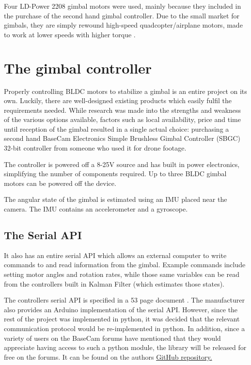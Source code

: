 Four LD-Power 2208 gimbal motors were used, mainly because they included in the purchase of the second hand gimbal controller. Due to the small market for gimbals, they are simply rewound high-speed quadcopter/airplane motors, made to work at lower speeds with higher torque \cite{website:rewinding_bldc_gimbal}.

\section{The gimbal controller}
Properly controlling BLDC motors to stabilize a gimbal is an entire project on its own. Luckily, there are well-designed existing products which easily fulfil the requirements needed. While research was made into the strengths and weakness of the various options available, factors such as local availability, price and time until reception of the gimbal resulted in a single actual choice: purchasing a second hand BaseCam Electronics Simple Brushless Gimbal Controller (SBGC) 32-bit controller \cite{website:basecam_sbgc} from someone who used it for drone footage.

The controller is powered off a 8-25V source and has built in power electronics, simplifying the number of components required. Up to three BLDC gimbal motors can be powered off the device.

The angular state of the gimbal is estimated using an IMU placed near the camera. The IMU contains an accelerometer and a gyroscope.

\subsection{The Serial API}

It also has an entire serial API which allows an external computer to write commands to and read information from the gimbal. Example commands include setting motor angles and rotation rates, while those same variables can be read from the controllers built in Kalman Filter (which estimates those states).

The controllers serial API is specified in a 53 page document \cite{website:sbgc_serial_api}. The manufacturer also provides an Arduino implementation of the serial API. However, since the rest of the project was implemented in python, it was decided that the relevant communication protocol would be re-implemented in python. In addition, since a variety of users on the BaseCam forums have mentioned that they would appreciate having access to such a python module, the library will be released for free on the forums. It can be found on the authors \href{https://github.com/alknemeyer/EEE4022S-Thesis-Project/blob/master/Final%20code/gimbal_control.ipynb}{GitHub repository.}

